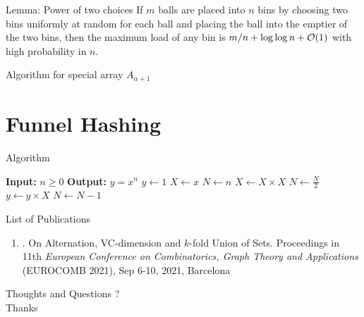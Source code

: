\documentclass{beamer}
\begin{document}
\begin{frame}
	\begin{block}{Lemma: Power of two choices}
		If $m$ balls are placed into $n$ bins by choosing two bins uniformly at random for each ball and placing the ball into the emptier of the two bins, then the maximum load of any bin is $m/n + \log{\log{n}} + {\cal O}(1)$ with high probability in $n$.
	\end{block}
\end{frame}

\begin{frame}{Algorithm for special array $A_{\alpha + 1}$}
	
\end{frame}

\section{Funnel Hashing}

%
\begin{frame}{Algorithm}
	\begin{center}
		
	\begin{algorithmic}[1]
		\STATE \textbf{Input:} $n \geq 0$
		\STATE \textbf{Output:} $y = x^n$
		\STATE $y \gets 1$
		\STATE $X \gets x$
		\STATE $N \gets n$
		\STATE $X \gets X \times X$
		\STATE $N \gets \frac{N}{2}$
		\ELSE
		\STATE $y \gets y \times X$
		\STATE $N \gets N - 1$
		\ENDIF
		\ENDWHILE
	\end{algorithmic}
\end{center}
\end{frame}

\begin{frame}
{\Large List of Publications }
\begin{enumerate}
\item {\color{blue}{Amit Roy and Jayalal Sarma}}.  On Alternation, VC-dimension and $k$-fold Union of Sets. Proceedings in 11th {\em European Conference on Combinatorics, Graph Theory and Applications} (EUROCOMB 2021), Sep 6-10, 2021, Barcelona 
\end{enumerate}
\end{frame}


\begin{frame}
\begin{center}
{\sc \LARGE Thoughts and Questions ?} \\
\vspace{3cm}
{\sc \large Thanks} 
\end{center}
\end{frame}





\end{document}
